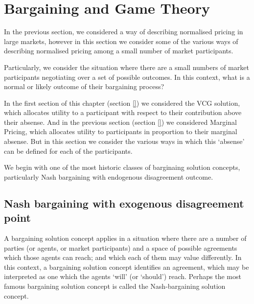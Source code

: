 \section{Bargaining and Game Theory}\label{sec:solutions_bargaining}

In the previous section, we considered a way of describing normalised pricing in large markets, however in this section we consider some of the various ways of describing normalised pricing among a small number of market participants.

Particularly, we consider the situation where there are a small numbers of market participants negotiating over a set of possible outcomes.
In this context, what is a normal or likely outcome of their bargaining process?

In the first section of this chapter (section \ref{}) we considered the VCG solution, which allocates utility to a participant with respect to their contribution above their absense.
And in the previous section (section \ref{}) we considered Marginal Pricing, which allocates utility to participants in proportion to their marginal absense.
But in this section we consider the various ways in which this `absense' can be defined for each of the participants.

We begin with one of the most historic classes of barginaing solution concepts, particularly Nash bargaining with endogenous disagreement outcome.

\subsection{Nash bargaining with exogenous disagreement point}\label{sec:nash_bargaining_exogenous}




A bargaining solution concept applies in a situation where there are a number of parties (or agents, or market participants) and a space of possible agreements which those agents can reach; and which each of them may value differently.
In this context, a bargaining solution concept identifies an agreement, which may be interpreted as one which the agents `will' (or `should') reach.
Perhaps the most famous bargaining solution concept is called the Nash-bargaining solution concept.

